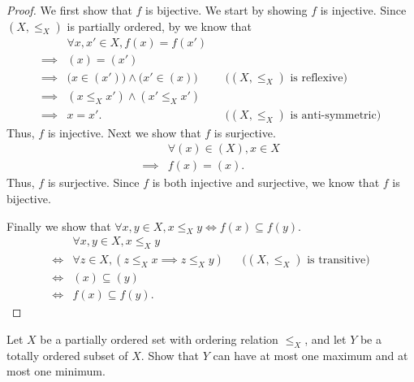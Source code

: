 \begin{proof}
  We first show that \(f\) is bijective.
  We start by showing \(f\) is injective.
  Since \((X, \leq_X)\) is partially ordered, by  we know that
  \begin{align*}
             & \forall x, x' \in X, f(x) = f(x')                                                               \\
    \implies & (x) = (x')                                                                                      \\
    \implies & \big(x \in (x')\big) \land \big(x' \in (x)\big) &  & \text{(\((X, \leq_X)\) is reflexive)}      \\
    \implies & (x \leq_X x') \land (x' \leq_X x')                                                              \\
    \implies & x = x'.                                         &  & \text{(\((X, \leq_X)\) is anti-symmetric)}
  \end{align*}
  Thus, \(f\) is injective.
  Next we show that \(f\) is surjective.
  \begin{align*}
             & \forall (x) \in (X), x \in X \\
    \implies & f(x) = (x).
  \end{align*}
  Thus, \(f\) is surjective.
  Since \(f\) is both injective and surjective, we know that \(f\) is bijective.

  Finally we show that \(\forall x, y \in X, x \leq_X y \iff f(x) \subseteq f(y)\).
  \begin{align*}
         & \forall x, y \in X, x \leq_X y                                                                \\
    \iff & \forall z \in X, (z \leq_X x \implies z \leq_X y) &  & \text{(\((X, \leq_X)\) is transitive)} \\
    \iff & (x) \subseteq (y)                                                                             \\
    \iff & f(x) \subseteq f(y).
  \end{align*}
\end{proof}

\begin{ex}\label{i:ex:8.5.7}
  Let \(X\) be a partially ordered set with ordering relation \(\leq_X\), and let \(Y\) be a totally ordered subset of \(X\).
  Show that \(Y\) can have at most one maximum and at most one minimum.
\end{ex}

